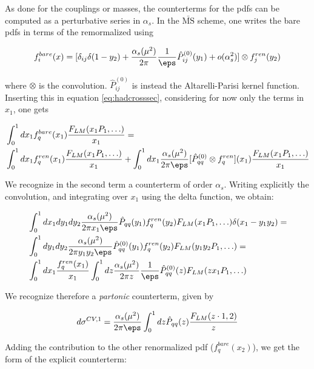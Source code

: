 \documentclass[11pt]{report}
\begin{document}
As done for the couplings or masses, the counterterms for the pdfs can be computed as a perturbative series in \(\alpha_s\). In the \(\bar{\text{MS}}\) scheme, one writes the bare pdfs in terms of the remormalized using 

\begin{align}
    f_i^{bare}(x) = [\delta_{ij}\delta(1-y_2)+\frac{\alpha_s(\mu^2)}{2\pi}\frac{1}{\eps}\hat{P}^{(0)}_{ij}(y_1) + o(\alpha_s^2)] \otimes f_j^{ren}(y_2)
\end{align}

where \(\otimes\) is the convolution. \(\hat{P}^{(0)}_{ij}\) is instead the Altarelli-Parisi kernel function. Inserting this in equation \ref{eq:hadcrosssec}, considering for now only the terms in \(x_1\), one gets 

\begin{align}
    &\int_0^1 dx_1 f_q^{bare}(x_1)\frac{F_{LM}(x_1P_1, \ldots)}{x_1} = \notag \\ 
    &\int_0^1 dx_1 f_q^{ren}(x_1)\frac{F_{LM}(x_1P_1, \ldots)}{x_1} + \int_0^1 dx_1 \frac{\alpha_s(\mu^2)}{2\pi\eps}[\hat{P}^{(0)}_{qq}\otimes f_q^{ren}](x_1) \frac{F_{LM}(x_1P_1, \ldots)}{x_1} 
\end{align}

We recognize in the second term a counterterm of order \(\alpha_s\). Writing explicitly the convolution, and integrating over \(x_1\) using the delta function, we obtain: 

\begin{align}
    &\int_0^1 dx_1 dy_1 dy_2 \frac{\alpha_s(\mu^2)}{2\pi x_1\eps}\hat{P}_{qq}(y_1)f_q^{ren}(y_2)F_{LM}(x_1P_1, \ldots)\delta(x_1- y_1y_2) =\notag \\ 
    &\int_0^1 dy_1 dy_2 \frac{\alpha_s(\mu^2)}{2\pi y_1 y_2\eps}\hat{P}^{(0)}_{qq}(y_1)f^{ren}_{q}(y_2)F_{LM}(y_1y_2 P_1, \ldots) \notag  = \\ 
    &\int_0^1 dx_1 \frac{f^{ren}_q (x_1)}{x_1}\int_0^1 dz \frac{\alpha_s(\mu^2)}{2\pi z} \frac{1}{\eps}\hat{P}^{(0)}_{qq}(z)F_{LM}(zx_1 P_1, \ldots)
\end{align}

We recognize therefore a \emph{partonic} counterterm, given by 

\begin{align}
    d\sigma^{CV, 1} = \frac{\alpha_s(\mu^2)}{2\pi\eps}\int_0^1 dz \hat{P}_{qq}(z)\frac{F_{LM}(z\cdot1, 2)}{z}
\end{align}

Adding the contribution to the other renormalized pdf (\(f^{bare}_{q}(x_2)\)), we get the form of the explicit counterterm: 
\end{document}
